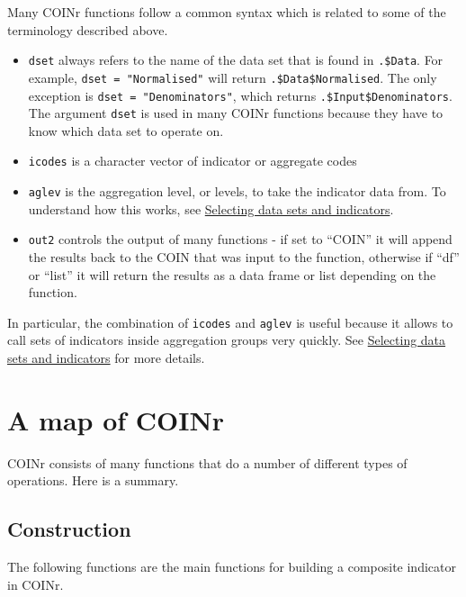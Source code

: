 \documentclass[
]{book}
\providecommand{\tightlist}{%
  \setlength{\itemsep}{0pt}\setlength{\parskip}{0pt}}
\begin{document}
Many COINr functions follow a common syntax which is related to some of the terminology described above.

\begin{itemize}
\tightlist
\item
  \texttt{dset} always refers to the name of the data set that is found in \texttt{.\$Data}. For example, \texttt{dset\ =\ "Normalised"} will return \texttt{.\$Data\$Normalised}. The only exception is \texttt{dset\ =\ "Denominators"}, which returns \texttt{.\$Input\$Denominators}. The argument \texttt{dset} is used in many COINr functions because they have to know which data set to operate on.
\item
  \texttt{icodes} is a character vector of indicator or aggregate codes
\item
  \texttt{aglev} is the aggregation level, or levels, to take the indicator data from. To understand how this works, see \protect\hyperlink{selecting-data-sets-and-indicators}{Selecting data sets and indicators}.
\item
  \texttt{out2} controls the output of many functions - if set to ``COIN'' it will append the results back to the COIN that was input to the function, otherwise if ``df'' or ``list'' it will return the results as a data frame or list depending on the function.
\end{itemize}

In particular, the combination of \texttt{icodes} and \texttt{aglev} is useful because it allows to call sets of indicators inside aggregation groups very quickly. See \protect\hyperlink{selecting-data-sets-and-indicators}{Selecting data sets and indicators} for more details.

\hypertarget{a-map-of-coinr}{%
\section{A map of COINr}\label{a-map-of-coinr}}

COINr consists of many functions that do a number of different types of operations. Here is a summary.

\hypertarget{construction}{%
\subsection{Construction}\label{construction}}

The following functions are the main functions for building a composite indicator in COINr.
\end{document}
